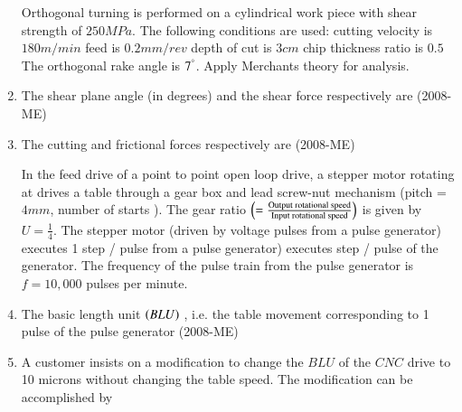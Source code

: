 \documentclass[journal]{IEEEtran}
\begin{document}
\begin{enumerate}
 Orthogonal turning is performed on a cylindrical work piece with shear strength of $250MPa.$
 The following conditions are used: cutting velocity is $180m/min$
 feed is $0.2mm/rev$
 depth of cut is $3cm$
 chip thickness ratio is $0.5$
 The orthogonal rake angle is $7^\degree$.
 Apply Merchants theory for analysis. \\
 \item The shear plane angle (in degrees) and the shear force respectively are  \hfill(2008-ME)
 \begin{enumerate}
 \end{enumerate}
 \item The cutting and frictional forces respectively are \label{83} \hfill(2008-ME)
\begin{enumerate}
\end{enumerate}

In the feed drive of a point to point open loop 
 drive, a stepper motor rotating at 
 drives a table through a gear box and lead screw-nut mechanism (pitch = $4mm$, number of starts 
). The gear ratio $\left(= \frac{\text{Output rotational speed}}{\text{Input rotational speed}}\right)$ is given by $U = \frac{1}{4}$.
 The stepper motor (driven by voltage pulses from a pulse generator) executes 1
 step / pulse from a pulse generator) executes 
 step / pulse of the generator. The frequency of the pulse train from the pulse generator is $f = 10,000$ pulses per minute. \\
 
 \item The basic length unit $\left(BLU\right)$
, i.e. the table movement corresponding to 1
 pulse of the pulse generator \label{84} \hfill(2008-ME)
 \begin{enumerate}
 \end{enumerate}
 \item A customer insists on a modification to change the $BLU$
 of the $CNC$
 drive to 10 microns without changing the table speed. The modification can be accomplished by 


\end{enumerate}
\end{document}
